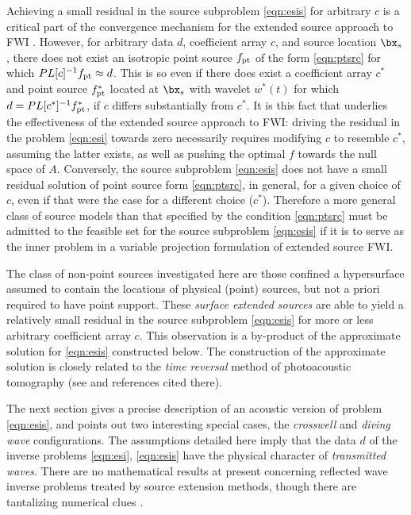Achieving a small residual in the source subproblem \ref{eqn:esis} for arbitrary $c$ is a critical part of the convergence mechanism for the extended source approach to FWI \cite[]{HuangNammourSymesDollizal:SEG19}. However, for arbitrary data $d$, coefficient array $c$, and source location $\bx_s$, there does not exist an isotropic point source $f_{\rm pt}$ of the form \ref{eqn:ptsrc} for which $PL[c]^{-1}f_{\rm pt} \approx d$. This is so even if there does exist a coefficient array $c^*$ and point source $f_{\rm pt}^*$ located at $\bx_s$ with wavelet $w^*(t)$ for which $d = PL[c^*]^{-1}f_{\rm pt}^*$, if $c$ differs substantially from $c^*$. It is this fact that underlies the effectiveness of the extended source approach to FWI:  driving the residual in the problem \ref{eqn:esi} towards zero necessarily requires modifying $c$ to resemble $c^*$, assuming the latter exists, as well as pushing the optimal $f$ towards the null space of $A$. Conversely, the source subproblem \ref{eqn:esis} does not have a small residual solution of point source form \ref{eqn:ptsrc}, in general, for a given choice of $c$, even if that were the case for a different choice ($c^*$). Therefore a more general class of source models than that specified by the condition \ref{eqn:ptsrc} must be admitted to the feasible set for the source subproblem \ref{eqn:esis} if it is to serve as the inner problem in a variable projection formulation of extended source FWI.

The class of non-point sources investigated here are those confined a hypersurface assumed to contain the locations of physical (point) sources, but not a priori required to have point support. These {\em surface extended sources} are able to yield a relatively small residual in the source subproblem \ref{eqn:esis} for more or less arbitrary coefficient array $c$. This observation is a by-product of the approximate solution for \ref{eqn:esis} constructed below. The construction of the approximate solution is closely related to the {\em time reversal} method of photoacoustic tomography (see \cite{StefanovUhlmannIP:09} and references cited there).

The next section gives a precise description of an acoustic version of problem \ref{eqn:esis}, and points out two interesting special cases, the {\em crosswell} and {\em diving wave} configurations. The assumptions detailed here imply that the data $d$ of the inverse problems \ref{eqn:esi}, \ref{eqn:esis} have the physical character of {\em transmitted waves}. There are no mathematical results at present concerning reflected wave inverse problems treated by source extension methods, though there are tantalizing numerical clues \cite[]{LeeuwenHerrmannWRI:13,Warner:14,Warner:16,LeeuwenHerrmann:16,HuangSymes:Geo17,HuangSymes:Geo18a,HuangSymes:Geo18b}.

